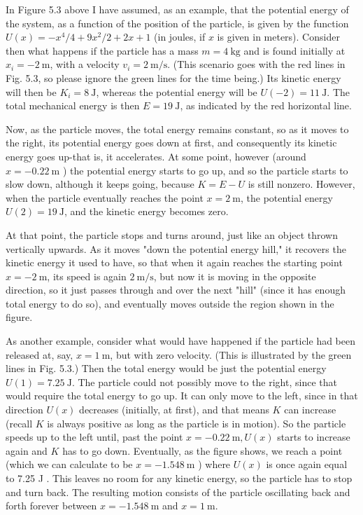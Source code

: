 \documentclass[10pt]{article}
\begin{document}
In Figure 5.3 above I have assumed, as an example, that the potential energy of the system, as a function of the position of the particle, is given by the function $U(x)=-x^{4} / 4+9 x^{2} / 2+2 x+1$ (in joules, if $x$ is given in meters). Consider then what happens if the particle has a mass $m=4 \mathrm{~kg}$ and is found initially at $x_{i}=-2 \mathrm{~m}$, with a velocity $v_{i}=2 \mathrm{~m} / \mathrm{s}$. (This scenario goes with the red lines in Fig. 5.3, so please ignore the green lines for the time being.) Its kinetic energy will then be $K_{i}=8 \mathrm{~J}$, whereas the potential energy will be $U(-2)=11 \mathrm{~J}$. The total mechanical energy is then $E=19 \mathrm{~J}$, as indicated by the red horizontal line.

Now, as the particle moves, the total energy remains constant, so as it moves to the right, its potential energy goes down at first, and consequently its kinetic energy goes up-that is, it accelerates. At some point, however (around $x=-0.22 \mathrm{~m}$ ) the potential energy starts to go up, and so the particle starts to slow down, although it keeps going, because $K=E-U$ is still nonzero. However, when the particle eventually reaches the point $x=2 \mathrm{~m}$, the potential energy $U(2)=19 \mathrm{~J}$, and the kinetic energy becomes zero.

At that point, the particle stops and turns around, just like an object thrown vertically upwards. As it moves "down the potential energy hill," it recovers the kinetic energy it used to have, so that when it again reaches the starting point $x=-2 \mathrm{~m}$, its speed is again $2 \mathrm{~m} / \mathrm{s}$, but now it is moving in the opposite direction, so it just passes through and over the next "hill" (since it has enough total energy to do so), and eventually moves outside the region shown in the figure.

As another example, consider what would have happened if the particle had been released at, say, $x=1 \mathrm{~m}$, but with zero velocity. (This is illustrated by the green lines in Fig. 5.3.) Then the total energy would be just the potential energy $U(1)=7.25 \mathrm{~J}$. The particle could not possibly move to the right, since that would require the total energy to go up. It can only move to the left, since in that direction $U(x)$ decreases (initially, at first), and that means $K$ can increase (recall $K$ is always positive as long as the particle is in motion). So the particle speeds up to the left until, past the point $x=-0.22 \mathrm{~m}, U(x)$ starts to increase again and $K$ has to go down. Eventually, as the figure shows, we reach a point (which we can calculate to be $x=-1.548 \mathrm{~m}$ ) where $U(x)$ is once again equal to 7.25 J . This leaves no room for any kinetic energy, so the particle has to stop and turn back. The resulting motion consists of the particle oscillating back and forth forever between $x=-1.548 \mathrm{~m}$ and $x=1 \mathrm{~m}$.
\end{document}

